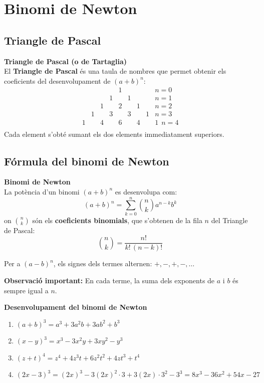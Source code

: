 \documentclass[12pt]{article}
\begin{document}
\newpage

\section{Binomi de Newton}

\subsection{Triangle de Pascal}

\begin{concept}
\textbf{Triangle de Pascal (o de Tartaglia)}\\
El \textbf{Triangle de Pascal} és una taula de nombres que permet obtenir els coeficients del desenvolupament de $(a+b)^n$:
\[
\begin{array}{ccccccccc}
& & & & 1 & & & & n=0 \\
& & & 1 & & 1 & & & n=1 \\
& & 1 & & 2 & & 1 & & n=2 \\
& 1 & & 3 & & 3 & & 1 & n=3 \\
1 & & 4 & & 6 & & 4 & & 1 \ \ n=4 \\
\end{array}
\]
Cada element s'obté sumant els dos elements immediatament superiors.
\end{concept}


\subsection{Fórmula del binomi de Newton}

\begin{concept}
\textbf{Binomi de Newton}\\
La potència d'un binomi $(a+b)^n$ es desenvolupa com:
\[
\boxed{(a+b)^n = \sum_{k=0}^{n} \binom{n}{k} a^{n-k} b^k}
\]
on $\binom{n}{k}$ són els \textbf{coeficients binomials}, que s'obtenen de la fila $n$ del Triangle de Pascal:
\[
\binom{n}{k} = \dfrac{n!}{k! \, (n-k)!}
\]

Per a $(a-b)^n$, els signes dels termes alternen: $+, -, +, -, \dots$


\textbf{Observació important:} En cada terme, la suma dels exponents de $a$ i $b$ és sempre igual a $n$.
\end{concept}

\begin{exemple}
\textbf{Desenvolupament del binomi de Newton}
\begin{enumerate}[label=\alph*)]
    \item $(a+b)^3 = a^3 + 3a^2 b + 3ab^2 + b^3$
    \item $(x-y)^3 = x^3 - 3x^2 y + 3xy^2 - y^3$
    \item $(z+t)^4 = z^4 + 4z^3 t + 6z^2 t^2 + 4zt^3 + t^4$
    \item $(2x-3)^3 = (2x)^3 - 3(2x)^2 \cdot 3 + 3(2x) \cdot 3^2 - 3^3 = 8x^3 - 36x^2 + 54x - 27$
\end{enumerate}
\end{exemple}
\end{document}
